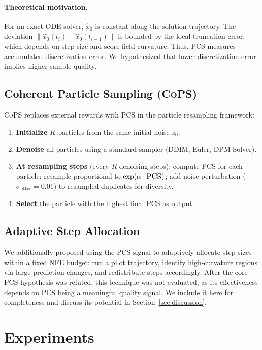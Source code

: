 \documentclass{article}
\newcommand{\cops}{\textsc{CoPS}}
\newcommand{\pcs}{\textsc{PCS}}
\newcommand{\xhat}{\hat{x}_0}
\begin{document}
\paragraph{Theoretical motivation.} For an exact ODE solver, $\xhat$ is constant along the solution trajectory. The deviation $\|\xhat(t_i) - \xhat(t_{i-1})\|$ is bounded by the local truncation error, which depends on step size and score field curvature. Thus, \pcs{} measures accumulated discretization error. We hypothesized that lower discretization error implies higher sample quality.

\subsection{Coherent Particle Sampling (\cops{})}

\cops{} replaces external rewards with \pcs{} in the particle resampling framework:
\begin{enumerate}
    \item \textbf{Initialize} $K$ particles from the same initial noise $z_0$.
    \item \textbf{Denoise} all particles using a standard sampler (DDIM, Euler, DPM-Solver).
    \item \textbf{At resampling steps} (every $R$ denoising steps): compute \pcs{} for each particle; resample proportional to $\exp(\alpha \cdot \text{\pcs{}})$; add noise perturbation ($\sigma_{\text{jitter}} = 0.01$) to resampled duplicates for diversity.
    \item \textbf{Select} the particle with the highest final \pcs{} as output.
\end{enumerate}

\subsection{Adaptive Step Allocation}

We additionally proposed using the \pcs{} signal to adaptively allocate step sizes within a fixed NFE budget: run a pilot trajectory, identify high-curvature regions via large prediction changes, and redistribute steps accordingly. After the core \pcs{} hypothesis was refuted, this technique was not evaluated, as its effectiveness depends on \pcs{} being a meaningful quality signal. We include it here for completeness and discuss its potential in Section~\ref{sec:discussion}.

\section{Experiments}
\label{sec:experiments}
\end{document}
